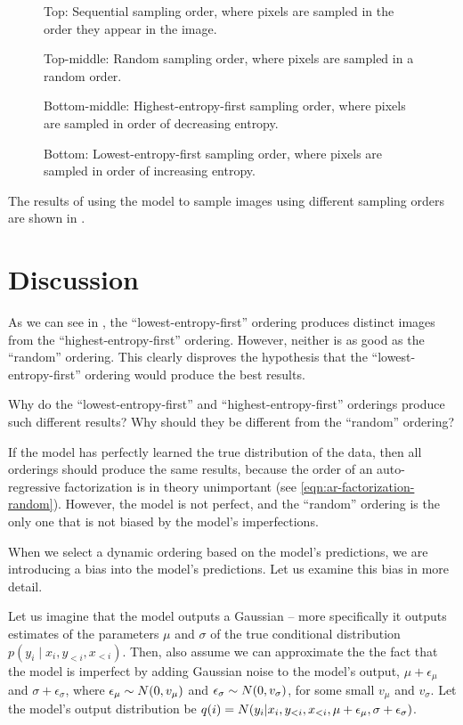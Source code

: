 \begin{figure}
{    Top: Sequential sampling order, where pixels are sampled in the order they appear in the image.

    Top-middle: Random sampling order, where pixels are sampled in a random order.

    Bottom-middle: Highest-entropy-first sampling order, where pixels are sampled in order of decreasing entropy.

    Bottom: Lowest-entropy-first sampling order, where pixels are sampled in order of increasing entropy.}
    \label{fig:order-comparison}
\end{figure}

The results of using the model to sample images using different sampling orders are shown in .

\section{Discussion}
\label{s:a-o-discussion}

As we can see in , the ``lowest-entropy-first'' ordering produces distinct images from the ``highest-entropy-first'' ordering. However, neither is as good as the ``random'' ordering. This clearly disproves the hypothesis that the ``lowest-entropy-first'' ordering would produce the best results.

Why do the ``lowest-entropy-first'' and ``highest-entropy-first'' orderings produce such different results? Why should they be different from the ``random'' ordering?

If the model has perfectly learned the true distribution of the data, then all orderings should produce the same results, because the order of an auto-regressive factorization is in theory unimportant (see \cref{eqn:ar-factorization-random}). However, the model is not perfect, and the ``random'' ordering is the only one that is not biased by the model's imperfections.

When we select a dynamic ordering based on the model's predictions, we are introducing a bias into the model's predictions. Let us examine this bias in more detail.

Let us imagine that the model outputs a Gaussian -- more specifically it outputs estimates of the parameters $\mu$ and $\sigma$ of the true conditional distribution $p(y_i \mid x_i, y_{<i}, x_{<i})$. Then, also assume we can approximate the the fact that the model is imperfect by adding Gaussian noise to the model's output, $\mu + \epsilon_\mu$ and $\sigma + \epsilon_\sigma$, where $\epsilon_\mu \sim \relax{N}(0, v_\mu)$ and $\epsilon_\sigma \sim \relax{N}(0, v_\sigma)$, for some small $v_\mu$ and $v_\sigma$. Let the model's output distribution be $q(i) = \relax{N}(y_i | x_i, y_{<i}, x_{<i}, \mu + \epsilon_\mu, \sigma + \epsilon_\sigma)$.


